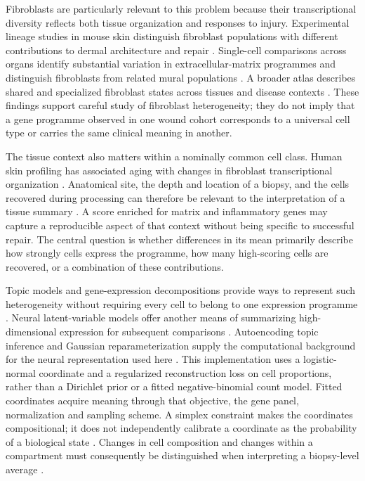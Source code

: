 \documentclass[10pt,a4paper]{article}
\begin{document}
Fibroblasts are particularly relevant to this problem because their transcriptional diversity reflects both tissue organization and responses to injury. Experimental lineage studies in mouse skin distinguish fibroblast populations with different contributions to dermal architecture and repair \citep{driskell2013}. Single-cell comparisons across organs identify substantial variation in extracellular-matrix programmes and distinguish fibroblasts from related mural populations \citep{muhl2020}. A broader atlas describes shared and specialized fibroblast states across tissues and disease contexts \citep{buechler2021}. These findings support careful study of fibroblast heterogeneity; they do not imply that a gene programme observed in one wound cohort corresponds to a universal cell type or carries the same clinical meaning in another.

The tissue context also matters within a nominally common cell class. Human skin profiling has associated aging with changes in fibroblast transcriptional organization \citep{soleboldo2020}. Anatomical site, the depth and location of a biopsy, and the cells recovered during processing can therefore be relevant to the interpretation of a tissue summary \citep{philippeos2018}. A score enriched for matrix and inflammatory genes may capture a reproducible aspect of that context without being specific to successful repair. The central question is whether differences in its mean primarily describe how strongly cells express the programme, how many high-scoring cells are recovered, or a combination of these contributions.

Topic models and gene-expression decompositions provide ways to represent such heterogeneity without requiring every cell to belong to one expression programme \citep{blei2003,kotliar2019}. Neural latent-variable models offer another means of summarizing high-dimensional expression for subsequent comparisons \citep{lopez2018}. Autoencoding topic inference and Gaussian reparameterization supply the computational background for the neural representation used here \citep{srivastava2017,kingma2014}. This implementation uses a logistic-normal coordinate and a regularized reconstruction loss on cell proportions, rather than a Dirichlet prior or a fitted negative-binomial count model. Fitted coordinates acquire meaning through that objective, the gene panel, normalization and sampling scheme. A simplex constraint makes the coordinates compositional; it does not independently calibrate a coordinate as the probability of a biological state \citep{aitchison1980}. Changes in cell composition and changes within a compartment must consequently be distinguished when interpreting a biopsy-level average \citep{buettner2021}.
\end{document}
